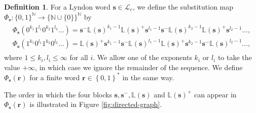 \documentclass[12pt]{amsart}
\theoremstyle{definition}
\newtheorem{definition}[theorem]{Definition}
\theoremstyle{remark}
\numberwithin{equation}{section}
\newcommand{\N}{\ensuremath{\mathbb{N}}}
\renewcommand{\L}{\ensuremath{\mathbb{L}}}
\newcommand{\cL}{\mathcal{L}}
\newcommand{\s}{ {\mathbf{s}}}
\renewcommand{\r}{ {\mathbf{r}}}
\newcommand{\set}[1]{\left\{#1\right\}}
\newcommand{\f}{\infty}
\begin{document}
{\begin{definition} \label{def:substitution}
For a Lyndon word $\s\in \cL_e$, we define the substitution map $\Phi_\s: \{0,1\}^\N\to \{\N\cup\{0\}\}^\N$ by
\begin{gather} \label{eq:block-map}
\begin{split}
\Phi_\s(0^{k_1}1^{l_1}0^{k_2}1^{l_2}\dots)=\s^-\L(\s)^{k_1-1}\L(\s)^+\s^{l_1-1}\s^-\L(\s)^{k_2-1}\L(\s)^+\s^{l_2-1}\dots,\\
\Phi_\s(1^{k_1}0^{l_1}1^{k_2}0^{l_2}\dots)=\L(\s)^+\s^{k_1-1}\s^-\L(\s)^{l_1-1}\L(\s)^+\s^{k_2-1}\s^-\L(\s)^{l_2-1}\dots,
\end{split}
\end{gather}
where $1\leq k_i, l_i\leq \f$ for all $i$.
We allow one of the exponents $k_i$ or $l_i$ to take the value $+\f$, in which case we ignore the remainder of the sequence. %
We define $\Phi_\s(\r)$ for a finite word $\r\in\set{0,1}^*$ in the same way. %
\end{definition}

The order in which the four blocks $\s,\s^-,\L(\s)$ and $\L(\s)^+$ can appear in $\Phi_\s(\r)$ is illustrated in Figure \ref{fig:directed-graph}.
   \begin{figure}[h!]
  \centering
\end{figure}}
\end{document}
